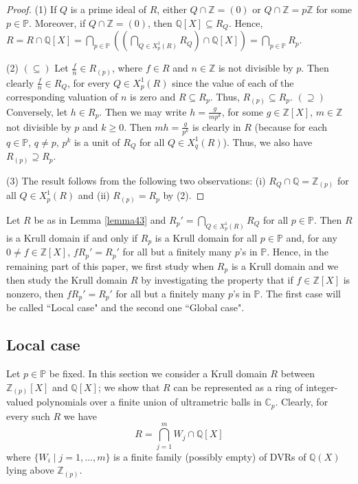 \documentclass[10pt]{article}
\numberwithin{equation}{section}
\theoremstyle{definition}
\theoremstyle{definition}
\newcommand{\Q}{\mathbb{Q}}
\newcommand{\Z}{\mathbb{Z}}
\newcommand{\C}{\mathbb{C}}
\newcommand{\PP}{\mathbb{P}}
\begin{document}

\begin{proof}
(1) If $Q$ is a prime ideal of $R$, either $Q \cap \Z = (0)$ or $Q \cap \Z = p\Z$ for some $p \in \PP$.
Moreover, if $Q \cap \Z = (0)$, then $\Q[X] \subseteq R_Q$. 
Hence, $R = R \cap \Q[X] = \bigcap\limits_{p \in \PP}((\bigcap\limits_{Q \in X^1_p(R)}R_Q) \cap \Q[X])
= \bigcap\limits_{p \in \PP}R_p$.

(2) $(\subseteq)$ Let $\frac{f}{n}\in R_{(p)}$, where $f\in R$ and $n\in\Z$ is not divisible by $p$. Then clearly $\frac{f}{n} \in R_Q$, 
for every $Q \in X^1_p(R)$ since the value of each of the corresponding valuation of $n$ is zero and $R\subseteq R_p$. 
Thus, $R_{(p)} \subseteq R_p$. 
$(\supseteq)$ Conversely, let $h\in R_p$. Then we may write $h=\frac{g}{mp^k}$, 
for some $g\in\Z[X]$, $m\in\Z$ not divisible by $p$ and $k\geq 0$. 
Then $mh=\frac{g}{p^k}$ is clearly in $R$ (because for each $q\in\PP$, $q\not=p$, $p^k$ is a unit of $R_Q$ for all $Q \in X^1_q(R)$). 
Thus, we also have $R_{(p)} \supseteq R_p$.

(3) The result follows from the following two observations: (i) $R_Q \cap \Q = \Z_{(p)}$ for all $Q \in X^1_p(R)$
and (ii) $R_{(p)} = R_p$ by (2).
\end{proof}


Let $R$ be as in Lemma \ref{lemma43} and $R_p' = \bigcap\limits_{Q \in X^1_p(R)}R_Q$ for all $p \in \PP$. Then $R$ is a Krull domain
if and only if $R_p$ is a Krull domain for all $p \in \PP$ and, for any $0 \neq f \in \Z[X]$, 
$fR_p' = R_p'$ for all but a finitely many $p$'s in $\PP$. 
Hence, in the remaining part of this paper, we first study when $R_p$ is a Krull domain and we then study the Krull domain $R$ by investigating the property that if $f \in \Z[X]$ is nonzero, then $fR_p' = R_p'$ for all but a finitely many $p$'s in $\PP$. The first case will be called ``Local case" and the second one ``Global case".   




\normalcolor

\subsection{Local case}\label{section local case}
Let $p\in\PP$ be fixed. In this section we consider a Krull domain $R$ between $\Z_{(p)}[X]$ and $\Q[X]$; we show that $R$ can be represented as a ring of integer-valued polynomials over a finite union of ultrametric balls  in $\C_p$. Clearly, for every such $R$ we have
\begin{equation}\label{representation R}
R=\bigcap_{j=1}^m W_j\cap\Q[X]
\end{equation}
where $\{W_i\mid j=1,\ldots,m\}$ is a finite family (possibly empty) of DVRs of $\Q(X)$  lying above $\Z_{(p)}$.
\end{document}
